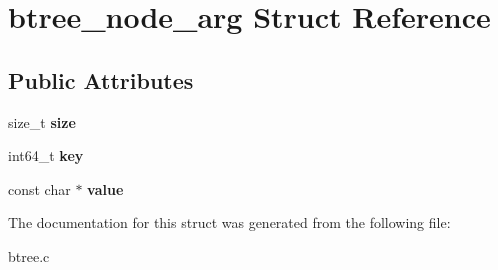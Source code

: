 \hypertarget{structbtree__node__arg}{}\section{btree\+\_\+node\+\_\+arg Struct Reference}
\label{structbtree__node__arg}
\subsection*{Public Attributes}
\begin{DoxyCompactItemize}
\item 
\mbox{\label{structbtree__node__arg_a14eb6fbb08477cefc15bac2da4c765f8}} 
size\+\_\+t {\bfseries size}
\item 
\mbox{\label{structbtree__node__arg_a3ef0f2b80b73a149700358a717799428}} 
int64\+\_\+t {\bfseries key}
\item 
\mbox{\label{structbtree__node__arg_a6732e14a29d800e8ccae2e700b93bca5}} 
const char $\ast$ {\bfseries value}
\end{DoxyCompactItemize}


The documentation for this struct was generated from the following file\+:\begin{DoxyCompactItemize}
\item 
btree.\+c\end{DoxyCompactItemize}

